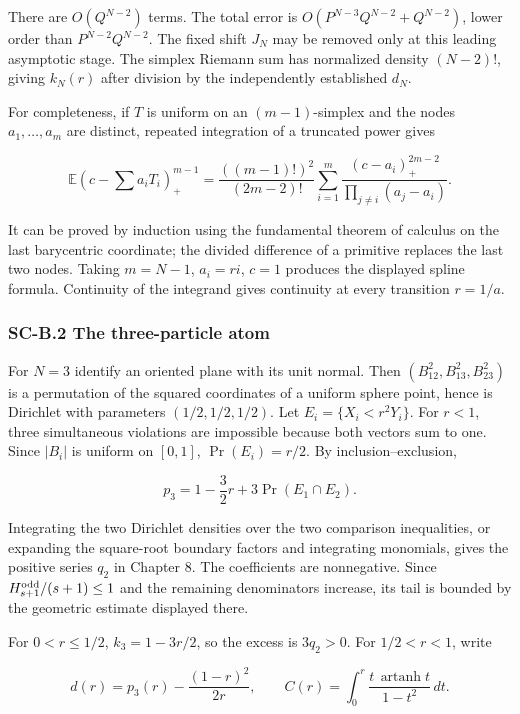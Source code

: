 \documentclass[a4paper,11pt]{article}
\numberwithin{equation}{section}
\begin{document}
There are \(O(Q^{N-2})\) terms. The total error is \(O(P^{N-3}Q^{N-2}+Q^{N-2})\), lower order than \(P^{N-2}Q^{N-2}\). The fixed shift \(J_N\) may be removed only at this leading asymptotic stage. The simplex Riemann sum has normalized density \((N-2)!\), giving \(k_N(r)\) after division by the independently established \(d_N\).

For completeness, if \(T\) is uniform on an \((m-1)\)-simplex and the nodes \(a_1,\ldots,a_m\) are distinct, repeated integration of a truncated power gives

\[
\mathbb E(c-\textstyle\sum a_iT_i)_+^{m-1}
=\frac{((m-1)!)^2}{(2m-2)!}
\sum_{i=1}^{m}\frac{(c-a_i)_+^{2m-2}}{\prod_{j\ne i}(a_j-a_i)}.
\]

It can be proved by induction using the fundamental theorem of calculus on the last barycentric coordinate; the divided difference of a primitive replaces the last two nodes. Taking \(m=N-1\), \(a_i=ri\), \(c=1\) produces the displayed spline formula. Continuity of the integrand gives continuity at every transition \(r=1/a\).

\hypertarget{sc-b.2-the-three-particle-atom}{%
\subsubsection{SC-B.2 The three-particle atom}\label{sc-b.2-the-three-particle-atom}}

For \(N=3\) identify an oriented plane with its unit normal. Then \((B_{12}^2,B_{13}^2,B_{23}^2)\) is a permutation of the squared coordinates of a uniform sphere point, hence is Dirichlet with parameters \((1/2,1/2,1/2)\). Let \(E_i=\{X_i<r^2Y_i\}\). For \(r<1\), three simultaneous violations are impossible because both vectors sum to one. Since \(|B_i|\) is uniform on \([0,1]\), \(\Pr(E_i)=r/2\). By inclusion--exclusion,

\[
p_3=1-\frac32r+3\Pr(E_1\cap E_2).
\]

Integrating the two Dirichlet densities over the two comparison inequalities, or expanding the square-root boundary factors and integrating monomials, gives the positive series \(q_2\) in Chapter 8. The coefficients are nonnegative. Since \(H_{s+1}^{\rm odd}/(s+1)\leq1\) and the remaining denominators increase, its tail is bounded by the geometric estimate displayed there.

For \(0<r\leq1/2\), \(k_3=1-3r/2\), so the excess is \(3q_2>0\). For \(1/2<r<1\), write

\[
d(r)=p_3(r)-\frac{(1-r)^2}{2r},\qquad
C(r)=\int_0^r\frac{t\,\operatorname{artanh}t}{1-t^2}\,dt.
\]
\end{document}
